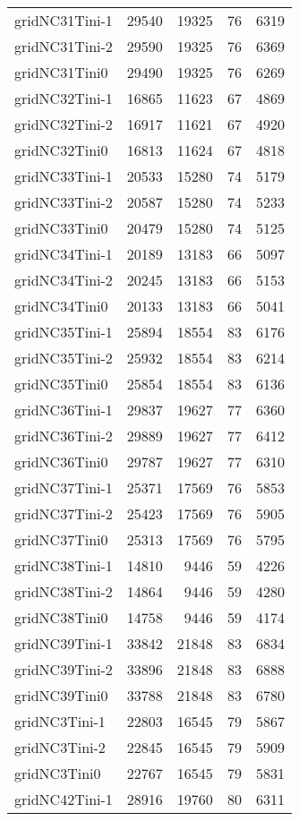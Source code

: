 \begin{longtable}{lrrrr}
gridNC31Tini-1 & 29540 & 19325 & 76 & 6319 \\
gridNC31Tini-2 & 29590 & 19325 & 76 & 6369 \\
gridNC31Tini0 & 29490 & 19325 & 76 & 6269 \\
gridNC32Tini-1 & 16865 & 11623 & 67 & 4869 \\
gridNC32Tini-2 & 16917 & 11621 & 67 & 4920 \\
gridNC32Tini0 & 16813 & 11624 & 67 & 4818 \\
gridNC33Tini-1 & 20533 & 15280 & 74 & 5179 \\
gridNC33Tini-2 & 20587 & 15280 & 74 & 5233 \\
gridNC33Tini0 & 20479 & 15280 & 74 & 5125 \\
gridNC34Tini-1 & 20189 & 13183 & 66 & 5097 \\
gridNC34Tini-2 & 20245 & 13183 & 66 & 5153 \\
gridNC34Tini0 & 20133 & 13183 & 66 & 5041 \\
gridNC35Tini-1 & 25894 & 18554 & 83 & 6176 \\
gridNC35Tini-2 & 25932 & 18554 & 83 & 6214 \\
gridNC35Tini0 & 25854 & 18554 & 83 & 6136 \\
gridNC36Tini-1 & 29837 & 19627 & 77 & 6360 \\
gridNC36Tini-2 & 29889 & 19627 & 77 & 6412 \\
gridNC36Tini0 & 29787 & 19627 & 77 & 6310 \\
gridNC37Tini-1 & 25371 & 17569 & 76 & 5853 \\
gridNC37Tini-2 & 25423 & 17569 & 76 & 5905 \\
gridNC37Tini0 & 25313 & 17569 & 76 & 5795 \\
gridNC38Tini-1 & 14810 & 9446 & 59 & 4226 \\
gridNC38Tini-2 & 14864 & 9446 & 59 & 4280 \\
gridNC38Tini0 & 14758 & 9446 & 59 & 4174 \\
gridNC39Tini-1 & 33842 & 21848 & 83 & 6834 \\
gridNC39Tini-2 & 33896 & 21848 & 83 & 6888 \\
gridNC39Tini0 & 33788 & 21848 & 83 & 6780 \\
gridNC3Tini-1 & 22803 & 16545 & 79 & 5867 \\
gridNC3Tini-2 & 22845 & 16545 & 79 & 5909 \\
gridNC3Tini0 & 22767 & 16545 & 79 & 5831 \\
gridNC42Tini-1 & 28916 & 19760 & 80 & 6311 \\

\end{longtable}

